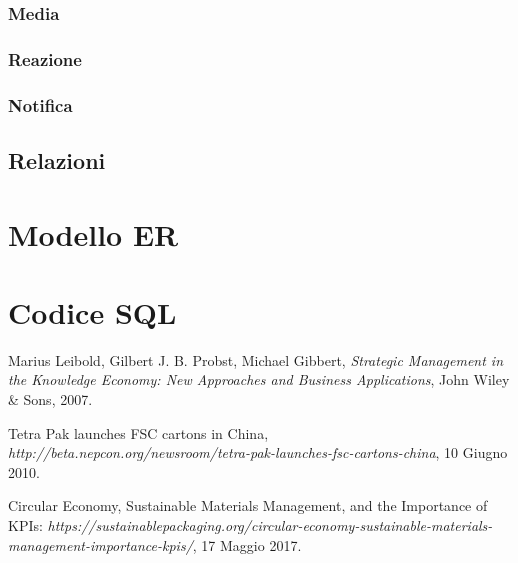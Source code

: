 \documentclass[paper=a4, fontsize=11pt,x11names]{report}
\begin{document}
\subsection{Media}

\subsection{Reazione}
\subsection{Notifica}

\section{Relazioni}

\chapter{Modello ER}

\chapter{Codice SQL}





\begin{thebibliography}{9}


 Marius Leibold, Gilbert J. B. Probst, Michael Gibbert,
  \textit{Strategic Management in the Knowledge Economy: New Approaches and Business Applications},
  John Wiley \& Sons,
 2007.
 
	Tetra Pak launches FSC cartons in China, \textit{http://beta.nepcon.org/newsroom/tetra-pak-launches-fsc-cartons-china},
	10 Giugno 2010.
	
	Circular Economy, Sustainable Materials Management, and the Importance of KPIs: \textit{https://sustainablepackaging.org/circular-economy-sustainable-materials-management-importance-kpis/},
	17 Maggio 2017.

\end{thebibliography}


\end{document}
